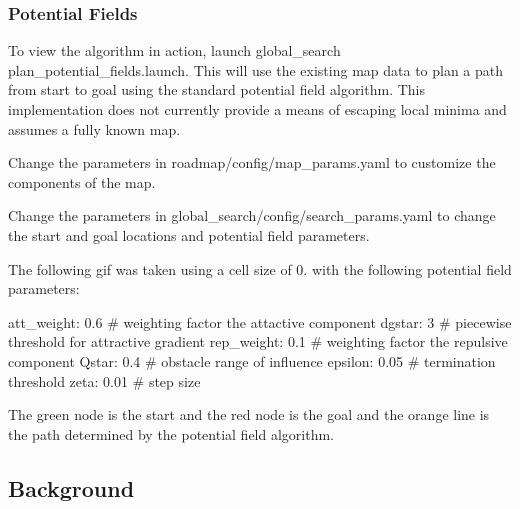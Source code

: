 \subsubsection*{Potential Fields}

To view the algorithm in action, launch {\ttfamily global\+\_\+search plan\+\_\+potential\+\_\+fields.\+launch}. This will use the existing map data to plan a path from start to goal using the standard potential field algorithm. This implementation does not currently provide a means of escaping local minima and assumes a fully known map.


\begin{DoxyItemize}
\item Change the parameters in {\ttfamily roadmap/config/map\+\_\+params.\+yaml} to customize the components of the map.
\item Change the parameters in {\ttfamily global\+\_\+search/config/search\+\_\+params.\+yaml} to change the start and goal locations and potential field parameters.
\end{DoxyItemize}

The following gif was taken using a cell size of 0. with the following potential field parameters\+: 
\begin{DoxyCode}
att\_weight: 0.6 # weighting factor the attactive component
dgstar: 3 # piecewise threshold for attractive gradient
rep\_weight: 0.1 # weighting factor the repulsive component
Qstar: 0.4 # obstacle range of influence
epsilon: 0.05 # termination threshold
zeta: 0.01 # step size
\end{DoxyCode}
 The green node is the start and the red node is the goal and the orange line is the path determined by the potential field algorithm.



\subsection*{Background}